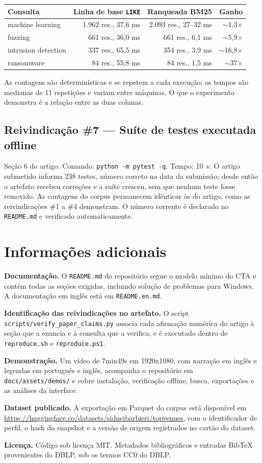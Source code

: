 \documentclass[12pt]{article}
\begin{document}
\begin{table}[h]
\centering
\begin{tabular}{lrrr}
\hline
Consulta & Linha de base \texttt{LIKE} & Ranqueada BM25 & Ganho \\
\hline
machine learning & 1.962 res., 37,6 ms & 2.093 res., 27--32 ms & $\sim$1,3$\times$ \\
fuzzing & 661 res., 36,0 ms & 661 res., 6,1 ms & $\sim$5,9$\times$ \\
intrusion detection & 337 res., 65,5 ms & 354 res., 3,9 ms & $\sim$16,8$\times$ \\
ransomware & 84 res., 55,8 ms & 84 res., 1,5 ms & $\sim$37$\times$ \\
\hline
\end{tabular}
\end{table}

As contagens são determinísticas e se repetem a cada execução; os tempos são
medianas de 11 repetições e variam entre máquinas. O que o experimento demonstra
é a relação entre as duas colunas.

\subsection{Reivindicação \#7 --- Suíte de testes executada offline}
Seção 6 do artigo. Comando: \texttt{python -m pytest -q}. Tempo: 10~s. O artigo
submetido informa 238 testes, número correto na data da submissão; desde então o
artefato recebeu correções e a suíte cresceu, sem que nenhum teste fosse
removido. As contagens do corpus permanecem idênticas às do artigo, como as
reivindicações \#1 a \#4 demonstram. O número corrente é declarado no
\texttt{README.md} e verificado automaticamente.

\section{Informações adicionais}

\textbf{Documentação.} O \texttt{README.md} do repositório segue o modelo mínimo
do CTA e contém todas as seções exigidas, incluindo solução de problemas para
Windows. A documentação em inglês está em \texttt{README.en.md}.

\textbf{Identificação das reivindicações no artefato.} O script
\texttt{scripts/verify\_paper\_claims.py} associa cada afirmação numérica do
artigo à seção que a enuncia e à consulta que a verifica, e é executado dentro
de \texttt{reproduce.sh} e \texttt{reproduce.ps1}.

\textbf{Demonstração.} Um vídeo de 7min49s em 1920x1080, com narração em inglês
e legendas em português e inglês, acompanha o repositório em
\texttt{docs/assets/demos/} e cobre instalação, verificação offline, busca,
exportações e as análises da interface.

\textbf{Dataset publicado.} A exportação em Parquet do corpus está disponível em
\url{https://huggingface.co/datasets/sidneibarbieri/topvenues}, com o
identificador de perfil, o hash do snapshot e a versão de origem registrados no
cartão do dataset.

\textbf{Licença.} Código sob licença MIT. Metadados bibliográficos e entradas
BibTeX provenientes do DBLP, sob os termos CC0 do DBLP.
\end{document}

